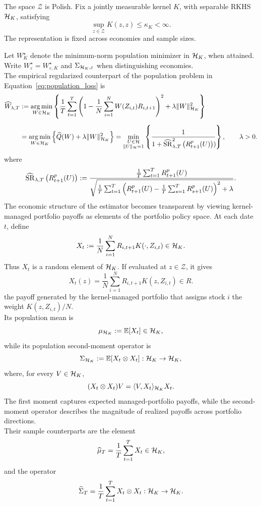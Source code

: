 \begin{assumption}
\label{ass:kernel}
The space $\mathscr Z$ is Polish. Fix a jointly measurable kernel $K$,
with separable RKHS $\mathcal{H}_K$, satisfying
\[
\sup_{z\in\mathscr Z}K(z,z)\leq\kappa_K<\infty.
\]
The representation is fixed across economies and sample sizes.
\end{assumption}
Let $W_K^\star$ denote the minimum-norm population minimizer in $\mathcal{H}_K$,
when attained. Write $W^\star_\varepsilon=W^\star_{\varepsilon,K}$ and
$\Sigma_{\mathcal{H}_K,\varepsilon}$ when distinguishing economies.\\
The empirical regularized counterpart of
the population problem in Equation~\eqref{eq:population_loss} is
\begin{equation}
\begin{aligned}
\widehat W_{\lambda,T}
&:=
\operatorname*{arg\,min}_{W\in\mathcal{H}_K}
\left\{
\frac1T\sum_{t=1}^T
\left(
1-\frac1N\sum_{i=1}^N
W(Z_{i,t})R_{i,t+1}
\right)^2
+
\lambda\|W\|_{\mathcal{H}_K}^2
\right\}
\\[0.5em]
&=
\operatorname*{arg\,min}_{W\in\mathcal{H}_K}
\left\{
\widehat Q(W)
+
\lambda\|W\|_{\mathcal{H}_K}^2
\right\}
=
\min_{\substack{U\in\mathcal{H}\\ \|U\|_{\mathcal{H}}=1}}
\left\{
\frac{1}{
1+\widehat{\operatorname{SR}}^2_{\lambda,T}
\left(R^p_{t+1}(U)\right))\!
}
\right\},
\qquad \lambda>0.
\end{aligned}
\label{eq:estimator}
\end{equation}
where
\[
\widehat{\operatorname{SR}}_{\lambda,T}
\left(R^p_{t+1}(U)\right)
:=
\frac{
\frac1T
\sum_{t=1}^T
R^p_{t+1}(U)
}{
\sqrt{
\frac1T
\sum_{t=1}^T
\left(
R^p_{t+1}(U)
-
\frac1T
\sum_{s=1}^T
R^p_{s+1}(U)
\right)^2
+\lambda
}
}.
\]
The economic structure of the estimator becomes transparent by viewing
kernel-managed portfolio payoffs as elements of the portfolio policy space.
At each date $t$, define
\[
X_t
:=
\frac{1}{N}
\sum_{i=1}^{N}
R_{i,t+1}K(\cdot,Z_{i,t})
\in\mathcal{H}_K.
\]
Thus $X_t$ is a random element of $\mathcal{H}_K$. If evaluated at
$z\in\mathscr Z$, it gives
\[
X_t(z)
=
\frac{1}{N}
\sum_{i=1}^{N}
R_{i,t+1}K(z,Z_{i,t}) \in R.
\]
the payoff generated by the kernel-managed portfolio that assigns stock $i$
the weight $K(z,Z_{i,t})/N$.\\
Its population mean is
\[
\mu_{\mathcal{H}_K}
:=
\mathbb{E}[X_t]
\in\mathcal{H}_K,
\]
while its population second-moment operator is
\[
\Sigma_{\mathcal{H}_K}
:=
\mathbb{E}[X_t\otimes X_t]
:
\mathcal{H}_K\rightarrow\mathcal{H}_K,
\]
where, for every $V\in\mathcal{H}_K$,
\[
(X_t\otimes X_t)V
=
\langle V,X_t\rangle_{\mathcal{H}_K}X_t.
\]
The first moment captures expected managed-portfolio payoffs, while the
second-moment operator describes the magnitude of realized payoffs across
portfolio directions.\\
Their sample counterparts are the element
\[
\widehat\mu_T
=
\frac{1}{T}\sum_{t=1}^{T}X_t
\in\mathcal{H}_K,
\]
and the operator
\[
\widehat\Sigma_T
=
\frac{1}{T}\sum_{t=1}^{T}X_t\otimes X_t
:
\mathcal{H}_K\rightarrow\mathcal{H}_K.
\]

